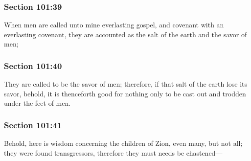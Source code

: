 	\subsubsection{Section 101:39} %
		\label{DC101-39}

		When men are called unto mine everlasting gospel, and covenant with an everlasting covenant, they are accounted as the salt of the earth and the savor of men;


	\subsubsection{Section 101:40} %
		\label{DC101-40}

		They are called to be the savor of men; therefore, if that salt of the earth lose its savor, behold, it is thenceforth good for nothing only to be cast out and trodden under the feet of men.


	\subsubsection{Section 101:41} %
		\label{DC101-41}

		Behold, here is wisdom concerning the children of Zion, even many, but not all; they were found transgressors, therefore they must needs be chastened---


